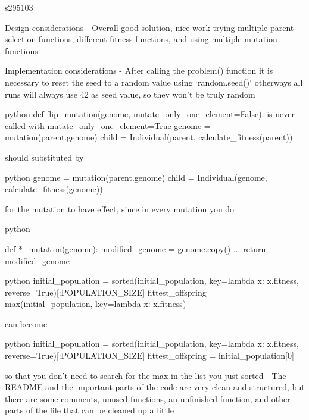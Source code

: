   \begin{tcolorbox}[colback=green!5!white,colframe=green!75!black,code={\singlespacing}]
    s295103
    \tcblower

  Design considerations
  - Overall good solution, nice work trying multiple parent selection functions, different fitness functions, and using multiple mutation functions

  Implementation considerations
  - After calling the problem() function it is necessary to reset the seed to a random value using `random.seed()` otherways all runs will always use 42 as seed value, so they won't be truly random

  \begin{mintedbox}{python}
    def flip_mutation(genome, mutate_only_one_element=False): is never called with mutate_only_one_element=True
    genome = mutation(parent.genome)
    child = Individual(parent, calculate_fitness(parent))
  \end{mintedbox}

  should substituted by

  \begin{mintedbox}{python}
    genome = mutation(parent.genome)
    child = Individual(genome, calculate_fitness(genome))
    \end{mintedbox}

    for the mutation to have effect, since in every mutation you do

    \begin{mintedbox}{python}

    def *_mutation(genome):
	modified_genome = genome.copy()
	...
	return modified_genome
\end{mintedbox}

\begin{mintedbox}{python}
    initial_population = sorted(initial_population, key=lambda x: x.fitness, reverse=True)[:POPULATION_SIZE]
fittest_offspring = max(initial_population, key=lambda x: x.fitness)
\end{mintedbox}

can become

\begin{mintedbox}{python}
initial_population = sorted(initial_population, key=lambda x: x.fitness, reverse=True)[:POPULATION_SIZE]
fittest_offspring = initial_population[0]
\end{mintedbox}

  so that you don't need to search for the max in the list you just sorted
  - The README and the important parts of the code are very clean and structured, but there are some comments, unused functions, an unfinished function, and other parts of the file that can be cleaned up a little
\end{tcolorbox}

